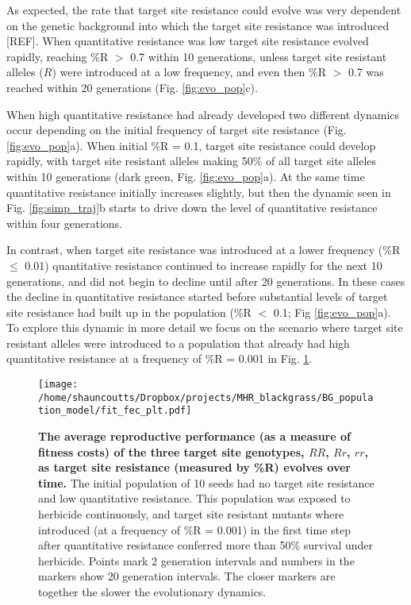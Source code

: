 \documentclass[10pt,letterpaper]{article}
\begin{document}
As expected, the rate that target site resistance could evolve was very dependent on the genetic background into which the target site resistance was introduced [REF]. When quantitative resistance was low target site resistance evolved rapidly, reaching \%R $>$ 0.7 within 10 generations, unless target site resistant alleles ($R$) were introduced at a low frequency, and even then \%R $>$ 0.7 was reached within 20 generations (Fig. \ref{fig:evo_pop}c).

When high quantitative resistance had already developed two different dynamics occur depending on the initial frequency of target site resistance (Fig. \ref{fig:evo_pop}a). When initial \%R = 0.1, target site resistance could develop rapidly, with target site resistant alleles making 50\% of all target site alleles within 10 generations (dark green, Fig. \ref{fig:evo_pop}a). At the same time quantitative resistance initially increases slightly, but then the dynamic seen in Fig. \ref{fig:simp_traj}b starts to drive down the level of quantitative resistance within four generations. 

In contrast, when target site resistance was introduced at a lower frequency (\%R $\leq$ 0.01) quantitative resistance continued to increase rapidly for the next 10 generations, and did not begin to decline until after 20 generations. In these cases the decline in quantitative resistance started before substantial levels of target site resistance had built up in the population (\%R $<$ 0.1; Fig \ref{fig:evo_pop}a). To explore this dynamic in more detail we focus on the scenario where target site resistant alleles were introduced to a population that already had high quantitative resistance at a frequency of \%R = 0.001 in Fig. \ref{fig:G_fit}. 

\begin{figure}[!h] 
	\texttt{[image: /home/shauncoutts/Dropbox/projects/MHR\_blackgrass/BG\_population\_model/fit\_fec\_plt.pdf]}
\caption{{\bf The average reproductive performance (as a measure of fitness costs) of the three target site genotypes, $RR$, $Rr$, $rr$, as target site resistance (measured by \%R) evolves over time.} The initial population of 10 seeds had no target site resistance and low quantitative resistance. This population was exposed to herbicide continuously, and target site resistant mutants where introduced (at a frequency of \%R = 0.001) in the first time step after quantitative resistance conferred more than 50\% survival under herbicide. Points mark 2 generation intervals and numbers in the markers show 20 generation intervals. The closer markers are together the slower the evolutionary dynamics.} 
\label{fig:G_fit}
\end{figure}
\end{document}
